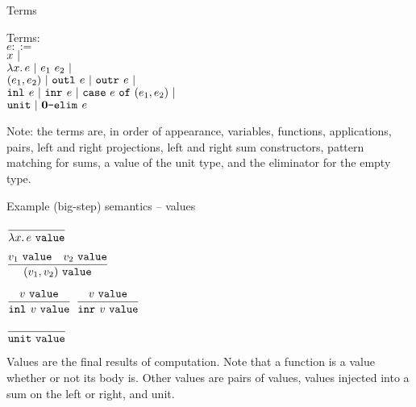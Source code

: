 \documentclass{beamer}
\begin{document}
\begin{frame}{Terms}

Terms: \\
$e ::=$ \\
\qquad $x \ |\ $ \\
\qquad $\fun{x}{e} \pipe \app{e_1}{e_2} \pipe$ \\
\qquad $(e_1, e_2) \ |\  \texttt{outl}_{}\ e \ |\  \texttt{outr}_{}\ e \ |\ $ \\
\qquad $\texttt{inl}_{}\ e \ |\  \texttt{inr}_{}\ e \ |\  \texttt{case}\ e\ \texttt{of}\ (e_1, e_2) \ |\ $ \\
\qquad $\texttt{unit} \ |\  \textbf{0}\texttt{-elim}_{}\ e$

\vspace{2em}

Note: the terms are, in order of appearance, variables, functions, applications, pairs, left and right projections, left and right sum constructors, pattern matching for sums, a value of the unit type, and the eliminator for the empty type.

\end{frame}

\begin{frame}{Example (big-step) semantics -- values}

\begin{center}
  $\infrule{}{\val{\fun{x}{e}}}$

  \vspace{2em}

  $\displaystyle \frac{v_1\ \texttt{value} \quad v_2\ \texttt{value}}{(v_1, v_2)\ \texttt{value}} \textsc{\footnotesize{}}$

  \vspace{2em}

  $\displaystyle \frac{v\ \texttt{value}}{\texttt{inl}_{}\ v\ \texttt{value}} \textsc{\footnotesize{}}$ \quad
  $\displaystyle \frac{v\ \texttt{value}}{\texttt{inr}_{}\ v\ \texttt{value}} \textsc{\footnotesize{}}$ \quad

  \vspace{2em}

  $\displaystyle \frac{}{\texttt{unit}\ \texttt{value}} \textsc{\footnotesize{}}$
\end{center}

\vspace{2em}

Values are the final results of computation. Note that a function is a value whether or not its body is. Other values are pairs of values, values injected into a sum on the left or right, and unit.

\end{frame}
\end{document}
